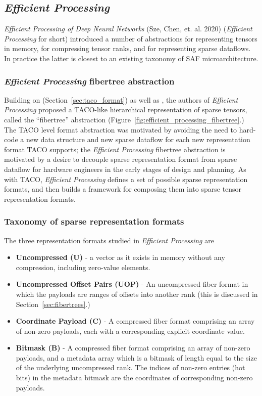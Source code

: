 \subsection{\textit{Efficient Processing}}

\textit{Efficient Processing of Deep Neural Networks}\cite{szebook} (Sze, Chen, et. al. 2020) (\textit{Efficient Processing} for short) introduced a number of abstractions for representing tensors in memory, for compressing tensor ranks, and for representing sparse dataflows. In practice the latter is closest to an existing taxonomy of SAF microarchitecture. 

\subsubsection{\textit{Efficient Processing} fibertree abstraction}

Building on \cite{taco_format} (Section~\ref{sec:taco_format}) as well as \cite{extensor}, the authors of \textit{Efficient Processing} proposed a TACO-like hierarchical representation of sparse tensors, called the ``fibertree'' abstraction (Figure~\ref{fig:efficient_processing_fibertree}.) The TACO level format abstraction was motivated by avoiding the need to hard-code a new data structure and new sparse dataflow for each new representation format TACO supports\cite{taco_format}; the \textit{Efficient Processing} fibertree abstraction is motivated by a desire to decouple sparse representation format from sparse dataflow for hardware engineers in the early stages of design and planning\cite{szebook}. As with TACO\cite{taco_format}, \textit{Efficient Processing} defines a set of possible sparse representation formats, and then builds a framework for composing them into sparse tensor representation formats.

\subsubsection{Taxonomy of sparse representation formats}

The three representation formats studied in \textit{Efficient Processing} are

\begin{itemize}
    \item \textbf{Uncompressed (U)} - a vector as it exists in memory without any compression, including zero-value elements.
    \item \textbf{Uncompressed Offset Pairs (UOP)} - An uncompressed fiber format in which the payloads are ranges of offsets into another rank (this is discussed in Section~\ref{sec:fibertrees}.)
    \item \textbf{Coordinate Payload (C)} - A compressed fiber format comprising an array of non-zero payloads, each with a corresponding explicit coordinate value.
    \item \textbf{Bitmask (B)} - A compressed fiber format comprising an array of non-zero payloads, and a metadata array which is a bitmask of length equal to the size of the underlying uncompressed rank. The indices of non-zero entries (hot bits) in the metadata bitmask are the coordinates of corresponding non-zero payloads.
\end{itemize}

